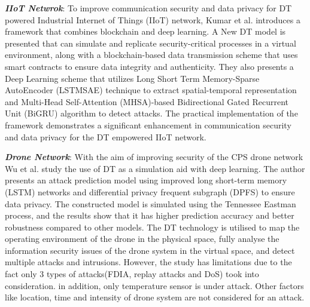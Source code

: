 
\textbf{\textit{IIoT Netwrok}}: To improve communication security and data privacy for DT powered Industrial Internet of Things (IIoT) network, Kumar et al.\cite{kumarBlockchainDeepLearning2022} introduces a framework that combines blockchain and deep learning. A New DT model is presented that  can simulate and replicate security-critical processes in a virtual environment, along with a blockchain-based data transmission scheme that uses smart contracts to ensure data integrity and authenticity. They also presents a Deep Learning scheme that utilizes Long Short Term Memory-Sparse AutoEncoder (LSTMSAE) technique to extract spatial-temporal representation and Multi-Head Self-Attention (MHSA)-based Bidirectional Gated Recurrent Unit (BiGRU) algorithm to detect attacks. The practical implementation of the framework demonstrates a significant enhancement in communication security and data privacy for the DT empowered IIoT network.



\textbf{\textit{Drone Network}}: With the aim of improving security of the CPS drone network Wu et al.\cite{wuDeepLearningDriven2022} study the use of DT as a simulation aid with deep learning.  
The author presents an attack prediction model  using improved long short-term memory (LSTM) networks and differential privacy frequent subgraph (DPFS) to ensure data privacy. The constructed model is simulated using the Tennessee Eastman process, and the results show that it has higher prediction accuracy and better robustness compared to other models. The DT technology is utilised to map the operating environment of the drone in the physical space, fully analyse the information security issues of the drone system in the virtual space, and detect multiple attacks and intrusions. However, the study has limitations due to the fact only 3 types of attacks(FDIA, replay attacks and DoS) took into consideration. in addition, only temperature sensor is under attack. Other factors like location, time and intensity of drone system are not considered for an attack.  





